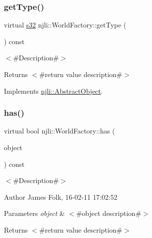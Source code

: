 \subsubsection{\texorpdfstring{get\+Type()}{getType()}}
{\footnotesize\ttfamily virtual \mbox{\hyperlink{_util_8h_aa62c75d314a0d1f37f79c4b73b2292e2}{s32}} njli\+::\+World\+Factory\+::get\+Type (\begin{DoxyParamCaption}{ }\end{DoxyParamCaption}) const\hspace{0.3cm}{\ttfamily [virtual]}}

$<$\#\+Description\#$>$

\begin{DoxyReturn}{Returns}
$<$\#return value description\#$>$ 
\end{DoxyReturn}


Implements \mbox{\hyperlink{classnjli_1_1_abstract_object_a08dcf202a47f0782813b8bc98c659e78}{njli\+::\+Abstract\+Object}}.

\mbox{\label{classnjli_1_1_world_factory_a5ba361b0dc1aff668f113172667981c4}} 
\subsubsection{\texorpdfstring{has()}{has()}}
{\footnotesize\ttfamily virtual bool njli\+::\+World\+Factory\+::has (\begin{DoxyParamCaption}\item[{\mbox{\hyperlink{classnjli_1_1_abstract_factory_object}{Abstract\+Factory\+Object}} $\ast$}]{object }\end{DoxyParamCaption}) const\hspace{0.3cm}{\ttfamily [virtual]}}



$<$\#\+Description\#$>$ 

\begin{DoxyAuthor}{Author}
James Folk, 16-\/02-\/11 17\+:02\+:52
\end{DoxyAuthor}

\begin{DoxyParams}{Parameters}
{\em object} & $<$\#object description\#$>$\\
\hline
\end{DoxyParams}
\begin{DoxyReturn}{Returns}
$<$\#return value description\#$>$ 
\end{DoxyReturn}
\mbox{\label{classnjli_1_1_world_factory_abfb139b97c6ed43ae5f25c80cc1fdf94}} 
